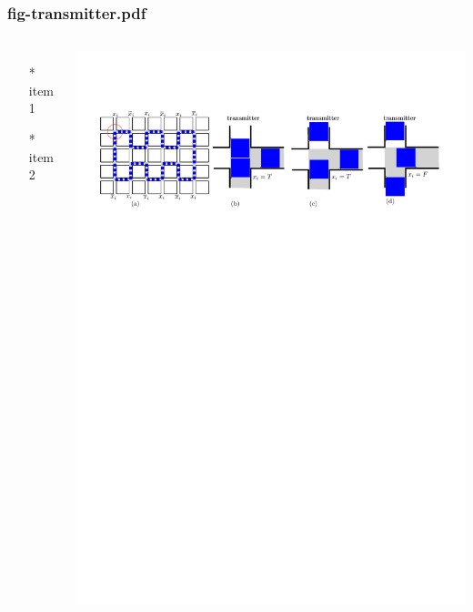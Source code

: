 \begin{frame} \frametitle{fig-transmitter.pdf}
    \begin{columns}[c]
        \begin{itemize}
            \item[*] item 1
            \item[*] item 2
        \end{itemize}
        \begin{minipage}{\linewidth}
            \begin{center}
            \includegraphics[width=.9\textwidth]{graphics/fig-transmitter.pdf}
            \label{gfx:fig-transmitter.pdf}
            \end{center}
        \end{minipage}
    \end{columns}
\end{frame}
